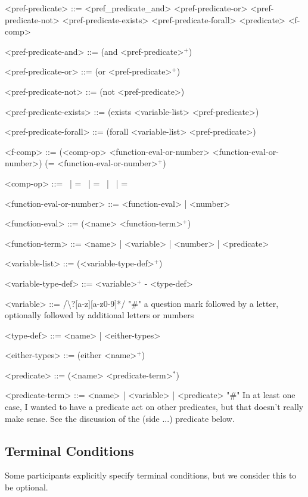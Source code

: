 \documentclass{article}
\begin{document}
\begin{grammar}
<pref-predicate> ::= <pref_predicate_and> \alt
    <pref-predicate-or> \alt
    <pref-predicate-not> \alt
    <pref-predicate-exists> \alt
    <pref-predicate-forall> \alt
    <predicate>
    <f-comp>

<pref-predicate-and> ::= (and <pref-predicate>$^+$)

<pref-predicate-or> ::= (or <pref-predicate>$^+$)

<pref-predicate-not> ::= (not <pref-predicate>)

<pref-predicate-exists> ::= (exists <variable-list> <pref-predicate>)

<pref-predicate-forall> ::= (forall <variable-list> <pref-predicate>)


<f-comp> ::= (<comp-op> <function-eval-or-number> <function-eval-or-number>) \alt
    (= <function-eval-or-number>$^+$)
    
<comp-op> ::=  \textlangle \ | \textlangle = \ | = \ | \textrangle \ | \textrangle =

<function-eval-or-number> ::= <function-eval> | <number>

<function-eval> ::= (<name> <function-term>$^+$)

<function-term> ::= <name> | <variable> | <number> | <predicate>

<variable-list> ::= (<variable-type-def>$^+$)

<variable-type-def> ::= <variable>$^+$ - <type-def>

<variable> ::= /\textbackslash?[a-z][a-z0-9]*/  "#" a question mark followed by a letter, optionally followed by additional letters or numbers

<type-def> ::= <name> | <either-types>

<either-types> ::= (either <name>$^+$)

<predicate> ::= (<name> <predicate-term>$^*$)

<predicate-term> ::= <name> | <variable> | <predicate> "#" In at least one case, I wanted to have a predicate act on other predicates, but that doesn't really make sense. See the discussion of the (side ...) predicate below.


\end{grammar}



\subsection{Terminal Conditions}
Some participants explicitly specify terminal conditions, but we consider this to be optional. 
        
\end{document}
